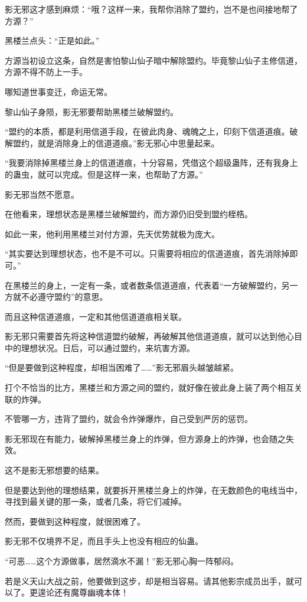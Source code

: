 \begin{this_body}
影无邪这才感到麻烦：“哦？这样一来，我帮你消除了盟约，岂不是也间接地帮了方源？”

黑楼兰点头：“正是如此。”

方源当初设立这条，自然是害怕黎山仙子暗中解除盟约。毕竟黎山仙子主修信道，方源不得不防上一手。

哪知道世事变迁，命运无常。

黎山仙子身陨，影无邪要帮助黑楼兰破解盟约。

“盟约的本质，都是利用信道手段，在彼此肉身、魂魄之上，印刻下信道道痕。破解盟约，就是消除身上的信道道痕。”影无邪心中思量起来。

“我要消除掉黑楼兰身上的信道道痕，十分容易，凭借这个超级蛊阵，还有我身上的蛊虫，就可以完成。但是这样一来，也帮助了方源。”

影无邪当然不愿意。

在他看来，理想状态是黑楼兰破解盟约，而方源仍旧受到盟约桎梏。

如此一来，他利用黑楼兰对付方源，先天优势就极为庞大。

“其实要达到理想状态，也不是不可以。只需要将相应的信道道痕，首先消除掉即可。”

在黑楼兰的身上，一定有一条，或者数条信道道痕，代表着“一方破解盟约，另一方就不必遵守盟约”的意思。

而且这种信道道痕，一定和其他信道道痕相关联。

影无邪只需要首先将这种信道盟约破解，再破解其他信道道痕，就可以达到他心目中的理想状况。日后，可以通过盟约，来坑害方源。

“但是要做到这种程度，却相当困难了……”影无邪眉头越皱越紧。

打个不恰当的比方，黑楼兰和方源之间的盟约，就好像在彼此身上装了两个相互关联的炸弹。

不管哪一方，违背了盟约，就会令炸弹爆炸，自己受到严厉的惩罚。

影无邪现在有能力，破解掉黑楼兰身上的炸弹，但方源身上的炸弹，也会随之失效。

这不是影无邪想要的结果。

但是要达到他的理想结果，就要拆开黑楼兰身上的炸弹，在无数颜色的电线当中，寻找到最关键的那一条，或者几条，将它们减掉。

然而，要做到这种程度，就很困难了。

影无邪不仅境界不足，而且手头上也没有相应的仙蛊。

“可恶……这个方源做事，居然滴水不漏！”影无邪心胸一阵郁闷。

若是义天山大战之前，他要做到这步，却是相当容易。请其他影宗成员出手，就可以了。更遑论还有魔尊幽魂本体！


\end{this_body}

